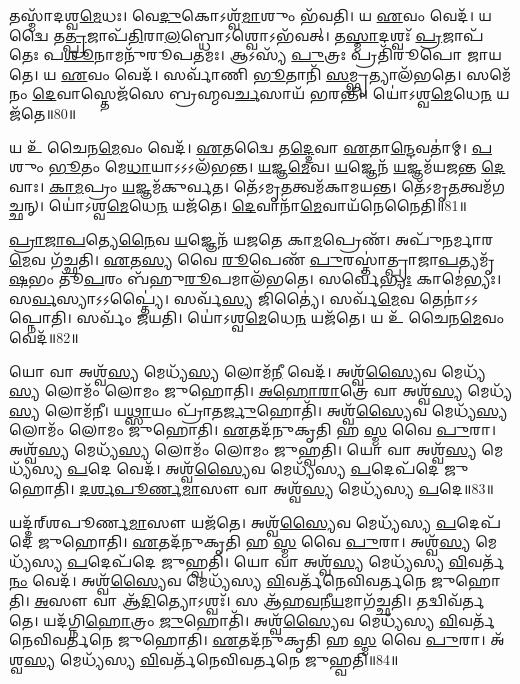 𑌤𑌸𑍍𑌮𑌾᳴𑌦𑌶𑍍𑌵\-\ul{𑌮𑍇}\-𑌧𑌃।
𑌵𑍇\-\ul{𑌦𑍁}\-𑌕𑍋\-𑌽𑌶𑍍𑌵᳴\-\ul{𑌮𑌾}\-𑌶𑍁𑌂 𑌭᳴𑌵𑌤𑌿।
𑌯 \ul{𑌏}\-𑌵𑌂 𑌵𑍇𑌦᳴।
𑌯𑌦𑍍𑌵𑍈 𑌤\-\ul{𑌤𑍍𑌪𑍍𑌰}\-𑌜𑌾𑌪᳴\-\ul{𑌤𑌿}\-𑌰𑌾\-\ul{𑌲}\-𑌬𑍍𑌧𑍋\-𑌽𑌶𑍍𑌵𑍋\-𑌽𑌭᳴𑌵𑌤𑍍।
𑌤\-\ul{𑌸𑍍𑌮𑌾}\-𑌦𑌶𑍍𑌵𑌃᳴ \ul{𑌪𑍍𑌰}\-𑌜𑌾𑌪᳴𑌤𑍇𑌃 𑌪\-\ul{𑌶𑍂}\-𑌨𑌾𑌮𑌨𑍁᳴𑌰𑍂𑌪𑌤𑌮𑌃।
𑌆𑌽𑌸𑍍𑌯᳴ \ul{𑌪𑍁}\-𑌤𑍍𑌰𑌃 𑌪𑍍𑌰𑌤𑌿᳴\-𑌰𑍂𑌪𑍋 𑌜𑌾𑌯𑌤𑍇।
𑌯 \ul{𑌏}\-𑌵𑌂 𑌵𑍇𑌦᳴।
𑌸𑌰𑍍𑌵𑌾᳴𑌣𑌿 \ul{𑌭𑍂}\-𑌤𑌾𑌨𑌿᳴ \ul{𑌸}\-𑌮𑍍𑌭𑍃𑌤𑍍𑌯𑌾𑌲᳴𑌭𑌤𑍇।
𑌸𑌮𑍇᳴𑌨𑌂 \ul{𑌦𑍇}\-𑌵𑌾𑌸𑍍𑌤𑍇𑌜᳴𑌸𑍇 𑌬𑍍𑌰𑌹𑍍𑌮𑌵\-\ul{𑌰𑍍𑌚}\-𑌸𑌾𑌯᳴ 𑌭𑌰𑌨𑍍𑌤𑌿।
𑌯𑍋॑𑌽𑌶𑍍𑌵\-\ul{𑌮𑍇}\-𑌧𑍇\-\ul{𑌨} 𑌯𑌜᳴𑌤𑍇॥80॥

𑌯 𑌉᳴ 𑌚𑍈𑌨\-\ul{𑌮𑍇}\-𑌵𑌂 𑌵𑍇𑌦᳴।
\-\ul{𑌏}\-𑌤𑌦𑍍𑌵𑍈 𑌤\-\ul{𑌦𑍍𑌦𑍇}\-𑌵𑌾 \ul{𑌏}\-𑌤𑌾\-\ul{𑌨𑍍𑌦𑍇}\-𑌵𑌤𑌾॑𑌮𑍍।
\-\ul{𑌪}\-𑌶𑍁𑌂 \ul{𑌭𑍂}\-𑌤𑌂 𑌮𑍇\-\ul{𑌧𑌾}\-𑌯𑌾𑌽𑌽𑌽𑌲᳴𑌭𑌨𑍍𑌤।
\-\ul{𑌯}\-𑌜𑍍𑌞\-\ul{𑌮𑍇}\-𑌵।
\-\ul{𑌯}\-𑌜𑍍𑌞𑍇𑌨᳴ \ul{𑌯}\-𑌜𑍍𑌞𑌮᳴𑌯𑌜𑌨𑍍𑌤 \ul{𑌦𑍇}\-𑌵𑌾𑌃।
\-\ul{𑌕𑌾}\-\-\ul{𑌮}\-𑌪𑍍𑌰𑌂 \ul{𑌯}\-𑌜𑍍𑌞𑌮᳴𑌕𑍁𑌰𑍍𑌵𑌤।
𑌤𑍇᳴𑌽𑌮𑍃\-\ul{𑌤}\-𑌤𑍍𑌵𑌮᳴𑌕𑌾𑌮𑌯𑌨𑍍𑌤।
𑌤𑍇᳴𑌽𑌮𑍃\-\ul{𑌤}\-𑌤𑍍𑌵𑌮᳴𑌗𑌚𑍍𑌛𑌨𑍍।
𑌯𑍋॑𑌽𑌶𑍍𑌵\-\ul{𑌮𑍇}\-𑌧𑍇\-\ul{𑌨} 𑌯𑌜᳴𑌤𑍇।
\-\ul{𑌦𑍇}\-𑌵𑌾𑌨𑌾᳴\-\ul{𑌮𑍇}\-𑌵𑌾𑌯᳴𑌨𑍇𑌨𑍈𑌤𑌿॥81॥

\-\ul{𑌪𑍍𑌰𑌾}\-\-\ul{𑌜𑌾}\-\-\ul{𑌪}\-𑌤𑍍𑌯𑍇\-\ul{𑌨𑍈}\-𑌵 \ul{𑌯}\-𑌜𑍍𑌞𑍇𑌨᳴ 𑌯𑌜𑌤𑍇 𑌕𑌾\-\ul{𑌮}\-𑌪𑍍𑌰𑍇𑌣᳴।
𑌅𑌪𑍁᳴𑌨𑌰𑍍𑌮𑌾𑌰\-\ul{𑌮𑍇}\-𑌵 𑌗᳴𑌚𑍍𑌛𑌤𑌿।
\-\ul{𑌏}\-𑌤\-\ul{𑌸𑍍𑌯} 𑌵𑍈 \ul{𑌰𑍂}\-𑌪𑍇𑌣᳴ \ul{𑌪𑍁}\-𑌰𑌸𑍍𑌤𑌾॑𑌤𑍍𑌪𑍍𑌰𑌾𑌜𑌾\-\ul{𑌪}\-𑌤𑍍𑌯𑌮𑍃᳴\-\ul{𑌷}\-𑌭𑌂 𑌤𑍂᳴\-\ul{𑌪}\-𑌰𑌂 𑌬᳴𑌹𑍁\-\ul{𑌰𑍂}\-𑌪𑌮𑌾𑌲᳴𑌭𑌤𑍇।
𑌸𑌰𑍍𑌵𑍇॑\-\ul{𑌭𑍍𑌯𑌃} 𑌕𑌾𑌮𑍇॑𑌭𑍍𑌯𑌃।
𑌸\-\ul{𑌰𑍍𑌵}\-𑌸𑍍𑌯𑌾𑌽𑌽𑌪𑍍𑌤𑍍𑌯𑍈॑।
𑌸𑌰𑍍𑌵᳴\-\ul{𑌸𑍍𑌯} 𑌜𑌿𑌤𑍍𑌯𑍈॑।
𑌸𑌰𑍍𑌵᳴\-\ul{𑌮𑍇}\-𑌵 𑌤𑍇𑌨𑌾॑𑌽𑌽𑌪𑍍𑌨𑍋𑌤𑌿।
𑌸𑌰𑍍𑌵𑌂᳴ 𑌜𑌯𑌤𑌿।
𑌯𑍋॑𑌽𑌶𑍍𑌵\-\ul{𑌮𑍇}\-𑌧𑍇\-\ul{𑌨} 𑌯𑌜᳴𑌤𑍇।
𑌯 𑌉᳴ 𑌚𑍈𑌨\-\ul{𑌮𑍇}\-𑌵𑌂 𑌵𑍇𑌦᳴॥82॥\anuvakamend[𑌮𑍇𑌧𑍋\-𑌽𑌭᳴\-\ul{𑌵}\-𑌦𑍍𑌯𑌜᳴𑌤 𑌏\-\ul{𑌤𑌿} 𑌵𑍇𑌦᳴]

𑌯𑍋 𑌵𑌾 𑌅𑌶𑍍𑌵᳴\-\ul{𑌸𑍍𑌯} 𑌮𑍇𑌧𑍍𑌯᳴\-\ul{𑌸𑍍𑌯} 𑌲𑍋𑌮᳴\-\ul{𑌨𑍀} 𑌵𑍇𑌦᳴।
𑌅𑌶𑍍𑌵᳴\-\ul{𑌸𑍍𑌯𑍈}\-𑌵 𑌮𑍇𑌧𑍍𑌯᳴\-\ul{𑌸𑍍𑌯} 𑌲𑍋𑌮𑌂᳴ 𑌲𑍋𑌮𑌂 𑌜𑍁𑌹𑍋𑌤𑌿।
\-\ul{𑌅}\-\-\ul{𑌹𑍋}\-\-\ul{𑌰𑌾}\-𑌤𑍍𑌰𑍇 𑌵𑌾 𑌅𑌶𑍍𑌵᳴\-\ul{𑌸𑍍𑌯} 𑌮𑍇𑌧𑍍𑌯᳴\-\ul{𑌸𑍍𑌯} 𑌲𑍋𑌮᳴𑌨𑍀।
𑌯\-\ul{𑌥𑍍𑌸𑌾}\-𑌯𑌂 𑌪𑍍𑌰𑌾᳴𑌤\-\ul{𑌰𑍍𑌜𑍁}\-𑌹𑍋𑌤𑌿᳴।
𑌅𑌶𑍍𑌵᳴\-\ul{𑌸𑍍𑌯𑍈}\-𑌵 𑌮𑍇𑌧𑍍𑌯᳴\-\ul{𑌸𑍍𑌯} 𑌲𑍋𑌮𑌂᳴ 𑌲𑍋𑌮𑌂 𑌜𑍁𑌹𑍋𑌤𑌿।
\-\ul{𑌏}\-𑌤𑌦᳴𑌨𑍁𑌕𑍃𑌤𑌿 𑌹 \ul{𑌸𑍍𑌮} 𑌵𑍈 \ul{𑌪𑍁}\-𑌰𑌾।
𑌅𑌶𑍍𑌵᳴\-\ul{𑌸𑍍𑌯} 𑌮𑍇𑌧𑍍𑌯᳴\-\ul{𑌸𑍍𑌯} 𑌲𑍋𑌮𑌂᳴ 𑌲𑍋𑌮𑌂 𑌜𑍁𑌹𑍍𑌵𑌤𑌿।
𑌯𑍋 𑌵𑌾 𑌅𑌶𑍍𑌵᳴\-\ul{𑌸𑍍𑌯} 𑌮𑍇𑌧𑍍𑌯᳴𑌸𑍍𑌯 \ul{𑌪}\-𑌦𑍇 𑌵𑍇𑌦᳴।
𑌅𑌶𑍍𑌵᳴\-\ul{𑌸𑍍𑌯𑍈}\-𑌵 𑌮𑍇𑌧𑍍𑌯᳴𑌸𑍍𑌯 \ul{𑌪}\-𑌦𑍇𑌪᳴𑌦𑍇 𑌜𑍁𑌹𑍋𑌤𑌿।
\-\ul{𑌦}\-\-\ul{𑌰𑍍}\-\-\ul{𑌶}\-\-\ul{𑌪𑍂}\-\-\ul{𑌰𑍍𑌣}\-\-\ul{𑌮𑌾}\-𑌸𑍗 𑌵𑌾 𑌅𑌶𑍍𑌵᳴\-\ul{𑌸𑍍𑌯} 𑌮𑍇𑌧𑍍𑌯᳴𑌸𑍍𑌯 \ul{𑌪}\-𑌦𑍇॥83॥

𑌯𑌦𑍍𑌦᳴𑌰𑍍‌\mbox{}𑌶𑌪𑍂𑌰𑍍𑌣\-\ul{𑌮𑌾}\-𑌸𑍗 𑌯𑌜᳴𑌤𑍇।
𑌅𑌶𑍍𑌵᳴\-\ul{𑌸𑍍𑌯𑍈}\-𑌵 𑌮𑍇𑌧𑍍𑌯᳴𑌸𑍍𑌯 \ul{𑌪}\-𑌦𑍇𑌪᳴𑌦𑍇 𑌜𑍁𑌹𑍋𑌤𑌿।
\-\ul{𑌏}\-𑌤𑌦᳴𑌨𑍁𑌕𑍃𑌤𑌿 𑌹 \ul{𑌸𑍍𑌮} 𑌵𑍈 \ul{𑌪𑍁}\-𑌰𑌾।
𑌅𑌶𑍍𑌵᳴\-\ul{𑌸𑍍𑌯} 𑌮𑍇𑌧𑍍𑌯᳴𑌸𑍍𑌯 \ul{𑌪}\-𑌦𑍇𑌪᳴𑌦𑍇 𑌜𑍁𑌹𑍍𑌵𑌤𑌿।
𑌯𑍋 𑌵𑌾 𑌅𑌶𑍍𑌵᳴\-\ul{𑌸𑍍𑌯} 𑌮𑍇𑌧𑍍𑌯᳴𑌸𑍍𑌯 \ul{𑌵𑌿}\-𑌵𑌰𑍍𑌤᳴\-\ul{𑌨𑌂} 𑌵𑍇𑌦᳴।
𑌅𑌶𑍍𑌵᳴\-\ul{𑌸𑍍𑌯𑍈}\-𑌵 𑌮𑍇𑌧𑍍𑌯᳴𑌸𑍍𑌯 \ul{𑌵𑌿}\-𑌵𑌰𑍍𑌤᳴𑌨𑍇𑌵𑌿𑌵𑌰𑍍𑌤𑌨𑍇 𑌜𑍁𑌹𑍋𑌤𑌿।
\-\ul{𑌅}\-𑌸𑍗 𑌵𑌾 𑌆᳴\-\ul{𑌦𑌿}\-𑌤𑍍𑌯𑍋\-𑌽𑌶𑍍𑌵𑌃᳴।
𑌸 𑌆᳴𑌹\-\ul{𑌵}\-𑌨𑍀\-\ul{𑌯}\-𑌮𑌾𑌗᳴𑌚𑍍𑌛𑌤𑌿।
𑌤𑌦𑍍𑌵𑌿𑌵᳴𑌰𑍍𑌤𑌤𑍇।
𑌯𑌦᳴𑌗𑍍𑌨𑌿\-\ul{𑌹𑍋}\-𑌤𑍍𑌰𑌂 \ul{𑌜𑍁}\-𑌹𑍋𑌤𑌿᳴।
𑌅𑌶𑍍𑌵᳴\-\ul{𑌸𑍍𑌯𑍈}\-𑌵 𑌮𑍇𑌧𑍍𑌯᳴𑌸𑍍𑌯 \ul{𑌵𑌿}\-𑌵𑌰𑍍𑌤᳴𑌨𑍇𑌵𑌿𑌵𑌰𑍍𑌤𑌨𑍇 𑌜𑍁𑌹𑍋𑌤𑌿।
\-\ul{𑌏}\-𑌤𑌦᳴𑌨𑍁𑌕𑍃𑌤𑌿 𑌹 \ul{𑌸𑍍𑌮} 𑌵𑍈 \ul{𑌪𑍁}\-𑌰𑌾।
𑌅᳴𑌶𑍍𑌵\-\ul{𑌸𑍍𑌯} 𑌮𑍇𑌧𑍍𑌯᳴𑌸𑍍𑌯 \ul{𑌵𑌿}\-𑌵𑌰𑍍𑌤᳴𑌨𑍇𑌵𑌿𑌵𑌰𑍍𑌤𑌨𑍇 𑌜𑍁𑌹𑍍𑌵𑌤𑌿॥84॥\anuvakamend[\-\ul{𑌪}\-𑌦𑍇 𑌅᳴𑌗𑍍𑌨𑌿\-\ul{𑌹𑍋}\-𑌤𑍍𑌰𑌂 \ul{𑌜𑍁}\-𑌹𑍋\-\ul{𑌤𑌿} 𑌤𑍍𑌰𑍀𑌣𑌿᳴ 𑌚]

